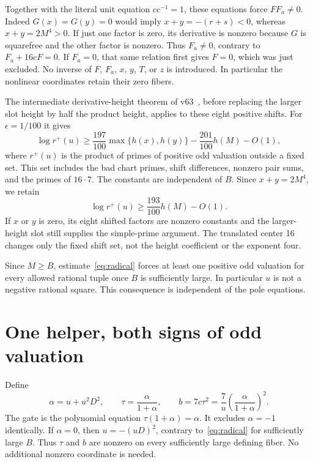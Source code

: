 \documentclass[11pt,a4paper]{article}
\begin{document}
Together with the literal unit equation $cc^{-1}=1$, these equations
force $F F_a\ne0$. Indeed $G(x)=G(y)=0$ would imply
$x+y=-(r+s)<0$, whereas $x+y=2M^4>0$. If just one factor is zero,
its derivative is nonzero because $G$ is squarefree and the other factor
is nonzero. Thus $F_a\ne0$, contrary to $F_a+16cF=0$.
If $F_a=0$, that same relation first gives $F=0$, which was just
excluded. No inverse of $F$, $F_a$, $x$, $y$, $T$, or $z$ is introduced.
In particular the nonlinear coordinates retain their zero fibers.

The intermediate derivative-height theorem of v63~\cite{v63}, before
replacing the larger slot height by half the product height, applies to
these eight positive shifts. For $\epsilon=1/100$ it gives
\[
 \log r^+(u)\ge\frac{197}{100}\max\{h(x),h(y)\}
                         -\frac{201}{100}h(M)-O(1),
\]
where $r^+(u)$ is the product of primes of positive odd valuation outside
a fixed set. This set includes the bad chart primes, shift differences,
nonzero pair sums, and the primes of $16\cdot7$. The constants are
independent of $B$. Since $x+y=2M^4$, we retain
\begin{equation}\label{eq:radical}
             \log r^+(u)\ge\frac{193}{100}h(M)-O(1).
\end{equation}
If $x$ or $y$ is zero, its eight shifted factors are nonzero constants
and the larger-height slot still supplies the simple-prime argument.
The translated center 16 changes only the fixed shift set, not the
height coefficient or the exponent four.

Since $M\ge B$, estimate~\eqref{eq:radical} forces at least one positive
odd valuation for every allowed rational tuple once $B$ is sufficiently
large. In particular $u$ is not a negative rational square. This
consequence is independent of the pole equations.

\section{One helper, both signs of odd valuation}

Define
\begin{equation}\label{eq:normalizer}
 \alpha=u+u^2D^2,\qquad
 \tau=\frac{\alpha}{1+\alpha},\qquad
 b=7c\tau^2=\frac7u\left(\frac{\alpha}{1+\alpha}\right)^2.
\end{equation}
The gate is the polynomial equation $\tau(1+\alpha)=\alpha$.
It excludes $\alpha=-1$ identically. If $\alpha=0$, then
$u=-(uD)^2$, contrary to~\eqref{eq:radical} for sufficiently large $B$.
Thus $\tau$ and $b$ are nonzero on every sufficiently large defining fiber.
No additional nonzero coordinate is needed.
\end{document}
